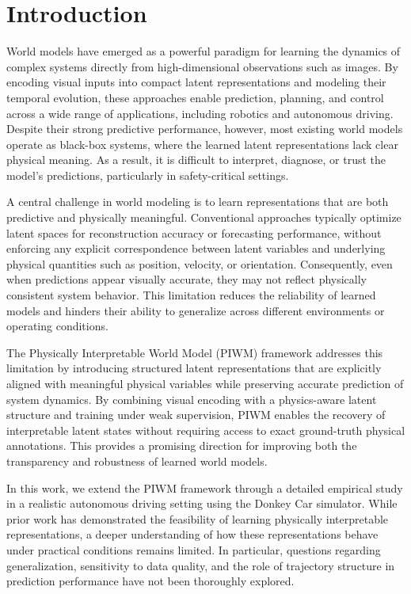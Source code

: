 \documentclass[preprint,12pt]{elsarticle}
\begin{document}
\section{Introduction}
    World models have emerged as a powerful paradigm for learning the dynamics of complex systems directly from high-dimensional observations such as images. By encoding visual inputs into compact latent representations and modeling their temporal evolution, these approaches enable prediction, planning, and control across a wide range of applications, including robotics and autonomous driving. Despite their strong predictive performance, however, most existing world models operate as black-box systems, where the learned latent representations lack clear physical meaning. As a result, it is difficult to interpret, diagnose, or trust the model’s predictions, particularly in safety-critical settings.

A central challenge in world modeling is to learn representations that are both predictive and physically meaningful. Conventional approaches typically optimize latent spaces for reconstruction accuracy or forecasting performance, without enforcing any explicit correspondence between latent variables and underlying physical quantities such as position, velocity, or orientation. Consequently, even when predictions appear visually accurate, they may not reflect physically consistent system behavior. This limitation reduces the reliability of learned models and hinders their ability to generalize across different environments or operating conditions.

The Physically Interpretable World Model (PIWM) framework addresses this limitation by introducing structured latent representations that are explicitly aligned with meaningful physical variables while preserving accurate prediction of system dynamics. By combining visual encoding with a physics-aware latent structure and training under weak supervision, PIWM enables the recovery of interpretable latent states without requiring access to exact ground-truth physical annotations. This provides a promising direction for improving both the transparency and robustness of learned world models.

In this work, we extend the PIWM framework through a detailed empirical study in a realistic autonomous driving setting using the Donkey Car simulator. While prior work has demonstrated the feasibility of learning physically interpretable representations, a deeper understanding of how these representations behave under practical conditions remains limited. In particular, questions regarding generalization, sensitivity to data quality, and the role of trajectory structure in prediction performance have not been thoroughly explored.
\end{document}
